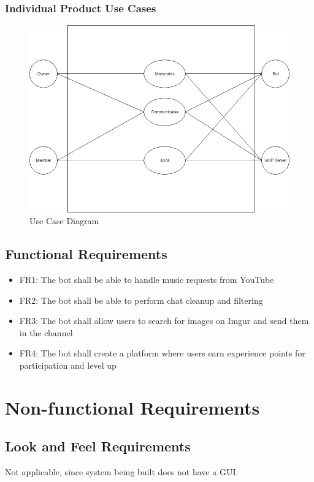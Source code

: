 \documentclass[12pt, titlepage]{article}
\begin{document}
\subsubsection{Individual Product Use Cases}
\begin{figure}
   \centering
   \includegraphics[width=\linewidth]{UseCaseDiagram.png}
   \caption{Use Case Diagram}
  \label{fig:use Case Diagram}
\end{figure}

\subsection{Functional Requirements}
\begin{itemize}
\color{blue}
\item FR1: The bot shall be able to handle music requests from YouTube
\item FR2: The bot shall be able to perform chat cleanup and filtering
\item FR3: The bot shall allow users to search for images on Imgur and send them in the channel
\item FR4: The bot shall create a platform where users earn experience points for participation and level up
\end{itemize}


\section{Non-functional Requirements}

\subsection{Look and Feel Requirements}
Not applicable, since system being built does not have a GUI. 
\end{document}
